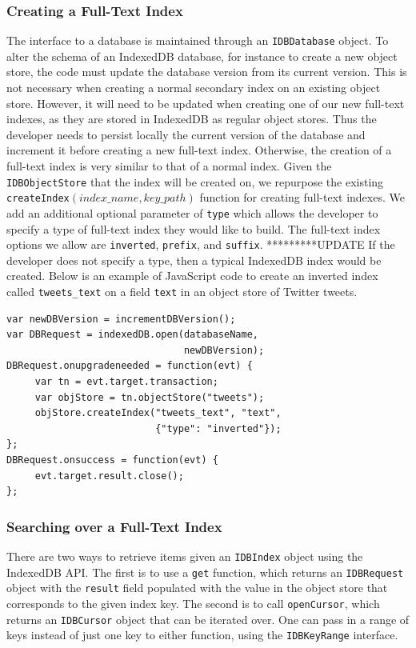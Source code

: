 \documentclass{vldb}
\begin{document}
\subsubsection{Creating a Full-Text Index}
The interface to a database is maintained through an \texttt{IDBDatabase} object.
To alter the schema of an IndexedDB database, for instance to create a new object store, the code must update the database version from its current version. This is not necessary when creating a normal secondary index on an existing object store. However, it will need to be updated when creating one of our new full-text indexes, as they are stored in IndexedDB as regular object stores. Thus the developer needs to persist locally the current version of the database and increment it before creating a new full-text index. Otherwise, the creation of a full-text index is very similar to that of a normal index. Given the \texttt{IDBObjectStore} that the index will be created on, we repurpose the existing \texttt{createIndex$\left(index\_name, key\_path\right)$} function for creating full-text indexes. We add an additional optional parameter of \texttt{type} which allows the developer to specify a type of full-text index they would like to build. The full-text index options we allow are \texttt{inverted}, \texttt{prefix}, and \texttt{suffix}. *********UPDATE If the developer does not specify a type, then a typical IndexedDB index would be created. Below is an example of JavaScript code to create an inverted index called \texttt{tweets\_text} on a field \texttt{text} in an object store of Twitter tweets.

\begin{verbatim}
var newDBVersion = incrementDBVersion();
var DBRequest = indexedDB.open(databaseName,
                               newDBVersion);
DBRequest.onupgradeneeded = function(evt) {
     var tn = evt.target.transaction;	
     var objStore = tn.objectStore("tweets");
     objStore.createIndex("tweets_text", "text", 
                          {"type": "inverted"});
};
DBRequest.onsuccess = function(evt) {
     evt.target.result.close();
};
\end{verbatim}


\subsubsection{Searching over a Full-Text Index}

There are two ways to retrieve items given an \texttt{IDBIndex} object using the IndexedDB API. 
The first is to use a \texttt{get} function, which returns an \texttt{IDBRequest} object with the \texttt{result} field populated with the value in the object store that corresponds to the given index key. The second is to call \texttt{openCursor}, which returns an \texttt{IDBCursor} object that can be iterated over. One can pass in a range of keys instead of just one key to either function, using the \texttt{IDBKeyRange} interface.
\end{document}
